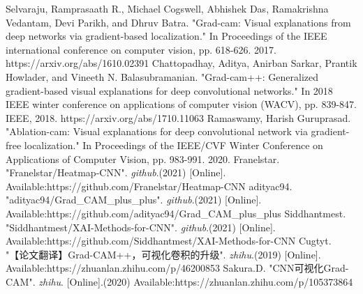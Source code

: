 \documentclass[conference]{IEEEtran}
\begin{document}
\begin{thebibliography}{00}
Selvaraju, Ramprasaath R., Michael Cogswell, Abhishek Das, Ramakrishna Vedantam, Devi Parikh, and Dhruv Batra. "Grad-cam: Visual explanations from deep networks via gradient-based localization." In Proceedings of the IEEE international conference on computer vision, pp. 618-626. 2017. https://arxiv.org/abs/1610.02391
 Chattopadhay, Aditya, Anirban Sarkar, Prantik Howlader, and Vineeth N. Balasubramanian. "Grad-cam++: Generalized gradient-based visual explanations for deep convolutional networks." In 2018 IEEE winter conference on applications of computer vision (WACV), pp. 839-847. IEEE, 2018. https://arxiv.org/abs/1710.11063
 Ramaswamy, Harish Guruprasad. "Ablation-cam: Visual explanations for deep convolutional 
network via gradient-free localization." In Proceedings of the IEEE/CVF Winter Conference on Applications of Computer Vision, pp. 983-991. 2020. 
Franelstar. "Franelstar/Heatmap-CNN". \textit{github}.(2021) [Online]. Available:https://github.com/Franelstar/Heatmap-CNN
adityac94. "adityac94/Grad_CAM_plus_plus". \textit{github}.(2021) [Online]. Available:https://github.com/adityac94/Grad_CAM_plus_plus
Siddhantmest. "Siddhantmest/XAI-Methods-for-CNN". \textit{github}.(2021) [Online]. Available:https://github.com/Siddhantmest/XAI-Methods-for-CNN
Cugtyt. "【论文翻译】Grad-CAM++，可视化卷积的升级". \textit{zhihu}.(2019) [Online]. Available:https://zhuanlan.zhihu.com/p/46200853
Sakura.D. "CNN可视化Grad-CAM". \textit{zhihu}. [Online].(2020) Available:https://zhuanlan.zhihu.com/p/105373864


\end{thebibliography}
\end{document}
